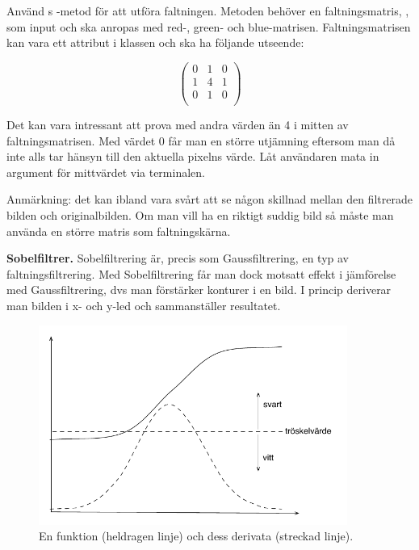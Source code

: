 Använd s -metod för att utföra faltningen. Metoden behöver en faltningsmatris, , som input och ska anropas med red-, green- och blue-matrisen. Faltningsmatrisen kan vara ett attribut i klassen och ska ha följande utseende:

\begin{displaymath}
\begin{pmatrix}
  0 & 1 & 0 \\
  1 & 4 & 1 \\
  0 & 1 & 0 \\
\end{pmatrix}
\end{displaymath}

Det kan vara intressant att prova med andra värden än 4 i mitten av faltningsmatrisen. Med värdet 0 får man en större utjämning eftersom man då inte alls tar hänsyn till den aktuella pixelns värde. Låt användaren mata in argument för mittvärdet via terminalen.

Anmärkning: det kan ibland vara svårt att se någon skillnad mellan den filtrerade bilden och originalbilden. Om man vill ha en riktigt suddig bild så måste man använda en större matris som faltningskärna.


\Task  \textbf{Sobelfiltrer.} Sobelfiltrering är, precis som Gaussfiltrering, en typ av faltningsfiltrering. Med Sobelfiltrering får man dock motsatt effekt i jämförelse med Gaussfiltrering, dvs man förstärker konturer i en bild. I princip deriverar man bilden i x- och y-led och sammanställer resultatet.

\begin{figure}[H]
\includegraphics[width=0.9\textwidth]{../img/w12-assignment-photo/derivatabild2.pdf}
\caption { En funktion (heldragen linje) och dess derivata (streckad linje).}
\label{fig:photo:sobelfilter:derivatabild}
\end{figure}

